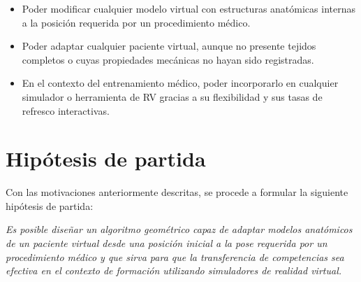 \begin{itemize}
    \item Poder modificar cualquier modelo virtual con estructuras anatómicas internas a la posición requerida por un procedimiento médico.
    \item Poder adaptar cualquier paciente virtual, aunque no presente tejidos completos o cuyas propiedades mecánicas no hayan sido registradas.
    \item En el contexto del entrenamiento médico, poder incorporarlo en cualquier simulador o herramienta de \ac{RV} gracias a su flexibilidad y sus tasas de refresco interactivas. 
\end{itemize}


\section{Hipótesis de partida} 
\label{intro:hipotesis}
Con las motivaciones anteriormente descritas, se procede a formular la siguiente hipótesis de partida:



\begin{center}
    \begin{minipage}{0.9\linewidth}
        {
\emph{Es posible diseñar un algoritmo geométrico capaz de adaptar modelos anatómicos de un paciente virtual desde una posición inicial a la pose requerida por un procedimiento médico y que sirva para que la transferencia de competencias sea efectiva en el contexto de formación utilizando simuladores de realidad virtual. }
        }
    \end{minipage}
    
    
\end{center}




